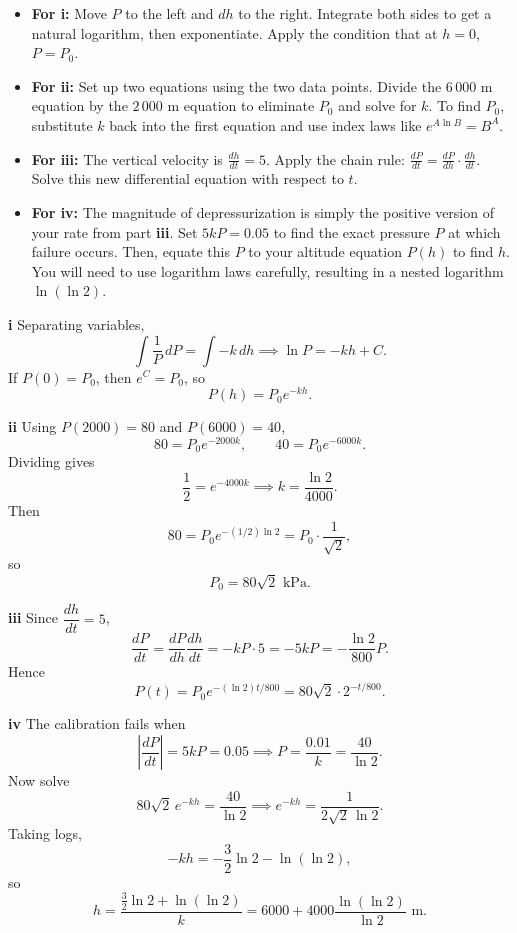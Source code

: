 \begin{hint}
\begin{itemize}
    \item \textbf{For i:} Move $P$ to the left and $dh$ to the right. Integrate both sides to get a natural logarithm, then exponentiate. Apply the condition that at $h=0$, $P=P_0$.
    \item \textbf{For ii:} Set up two equations using the two data points. Divide the $6\,000$ m equation by the $2\,000$ m equation to eliminate $P_0$ and solve for $k$. To find $P_0$, substitute $k$ back into the first equation and use index laws like $e^{A \ln B} = B^A$.
    \item \textbf{For iii:} The vertical velocity is $\frac{dh}{dt} = 5$. Apply the chain rule: $\frac{dP}{dt} = \frac{dP}{dh} \cdot \frac{dh}{dt}$. Solve this new differential equation with respect to $t$. 
    \item \textbf{For iv:} The magnitude of depressurization is simply the positive version of your rate from part \textbf{iii}. Set $5kP = 0.05$ to find the exact pressure $P$ at which failure occurs. Then, equate this $P$ to your altitude equation $P(h)$ to find $h$. You will need to use logarithm laws carefully, resulting in a nested logarithm $\ln(\ln 2)$.
\end{itemize}
\end{hint}

\begin{solution}
\textbf{i} Separating variables,
\[
\int \frac{1}{P}\,dP=\int -k\,dh
\implies \ln P=-kh+C.
\]
If $P(0)=P_0$, then $e^C=P_0$, so
\[
\boxed{P(h)=P_0e^{-kh}}.
\]

\textbf{ii} Using $P(2000)=80$ and $P(6000)=40$,
\[
80=P_0e^{-2000k}, \qquad 40=P_0e^{-6000k}.
\]
Dividing gives
\[
\frac12=e^{-4000k}
\implies
\boxed{k=\frac{\ln 2}{4000}}.
\]
Then
\[
80=P_0e^{-(1/2)\ln 2}=P_0\cdot \frac{1}{\sqrt2},
\]
so
\[
\boxed{P_0=80\sqrt2\text{ kPa}}.
\]

\textbf{iii} Since $\dfrac{dh}{dt}=5$,
\[
\frac{dP}{dt}=\frac{dP}{dh}\frac{dh}{dt}=-kP\cdot 5=-5kP
=-\frac{\ln 2}{800}P.
\]
Hence
\[
P(t)=P_0e^{-(\ln 2)t/800}
=\boxed{80\sqrt2\cdot 2^{-t/800}}.
\]

\textbf{iv} The calibration fails when
\[
\left|\frac{dP}{dt}\right|=5kP=0.05
\implies
P=\frac{0.01}{k}=\frac{40}{\ln 2}.
\]
Now solve
\[
80\sqrt2\,e^{-kh}=\frac{40}{\ln 2}
\implies
e^{-kh}=\frac{1}{2\sqrt2\,\ln 2}.
\]
Taking logs,
\[
-kh=-\frac32\ln 2-\ln(\ln 2),
\]
so
\[
h=\frac{\frac32\ln 2+\ln(\ln 2)}{k}
=\boxed{6000+4000\frac{\ln(\ln 2)}{\ln 2}\text{ m}}.
\]
\end{solution}


